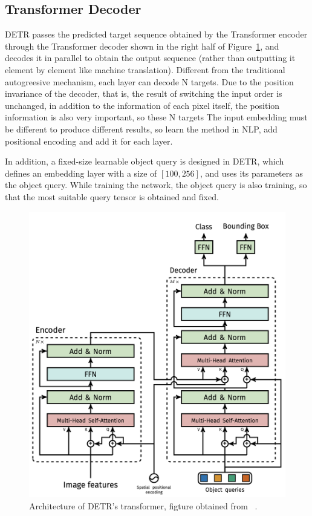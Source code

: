 \subsection{Transformer Decoder}

DETR passes the predicted target sequence obtained by the Transformer encoder through the Transformer decoder shown in the right half of Figure~\ref{fig:detrtr}, and decodes it in parallel to obtain the output sequence (rather than outputting it element by element like machine translation). Different from the traditional autogreesive mechanism, each layer can decode N targets. Due to the position invariance of the decoder, that is, the result of switching the input order is unchanged, in addition to the information of each pixel itself, the position information is also very important, so these N targets The input embedding must be different to produce different results, so learn the method in NLP, add positional encoding and add it for each layer.

In addition, a fixed-size learnable object query is designed in DETR, which defines an embedding layer with a size of $ [100, 256] $, and uses its parameters as the object query. While training the network, the object query is also training, so that the most suitable query tensor is obtained and fixed.

\begin{figure}[h]
	\centering
	\includegraphics[width=0.7\linewidth]{figures/detr_tr}
	\caption[Architecture of DETR's transformer]{Architecture of DETR's transformer, figture obtained from ~\cite{carion2020end}.}
	\label{fig:detrtr}
\end{figure}


